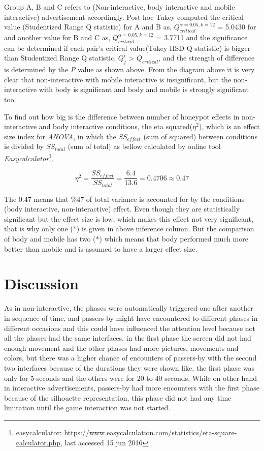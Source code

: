 Group A, B and C refers to (Non-interactive, body interactive and mobile interactive) advertisement accordingly. Post-hoc Tukey computed the critical value (Studentized Range Q statistic) for A and B as, ${Q}_{critical}^{\alpha=0.05,k=12}$ = 5.0430 for and another  value for B and C as, ${Q}_{critical}^{\alpha=0.05,k=12}$ = 3.7711 and the significance can be determined if each pair’s critical value(Tukey HSD Q statistic) is bigger than Studentized Range Q statistic. ${Q}_{j}^{i }$ > ${Q}_{critical}$, and the strength of difference is determined by the \emph{P} value as shown above. From the diagram above it is very clear that non-interactive with mobile interactive is insignificant, but the non-interactive with body is significant and body and mobile is strongly significant too.

To find out how big is the difference between number of honeypot effects in non-interactive and body interactive conditions, the eta squared(${\eta}^2$), which is an effect size index for \emph{ANOVA}, in which the $SS_{effect}$ (sum of squared) between conditions is divided by $SS_{total}$  (sum of total) as bellow calculated by online tool \emph{Easycalculator}\footnote{easycalculator: \url{https://www.easycalculation.com/statistics/eta-square-calculator.php}, last accessed 15 jun 2016}.

\[
{\eta}^2 = \frac{{SS}_{effect}}{{SS}_{total}} = \frac{6.4}{13.6} = 0.4706 \approx 0.47
\]

The 0.47 means that \%47 of total variance is accounted for by the conditions (body interactive, non-interactive) effect. Even though they are statistically significant but the effect size is low, which makes this effect not very significant, that is why only one (*) is given in above inference column. But the comparison of body and mobile has two (*) which means that body performed much more better than mobile and is assumed to have a larger effect size.


\section{Discussion}

As in non-interactive, the phases were automatically triggered one after another in sequence of time, and passers-by might have encountered to different phases in different occasions and this could have influenced the attention level because not all the phases had the same interfaces, in the first phase the screen did not had enough movement and the other phases had more pictures, movements and colors, but there was a higher chance of encounters of passers-by with the second two interfaces because of the durations they were shown like, the first phase was only for 5 seconds and the others were for 20 to 40 seconds. While on other hand in interactive advertisements, passers-by had more encounters with the first phase because of the silhouette representation, this phase did not had any time limitation until the game interaction was not started.


